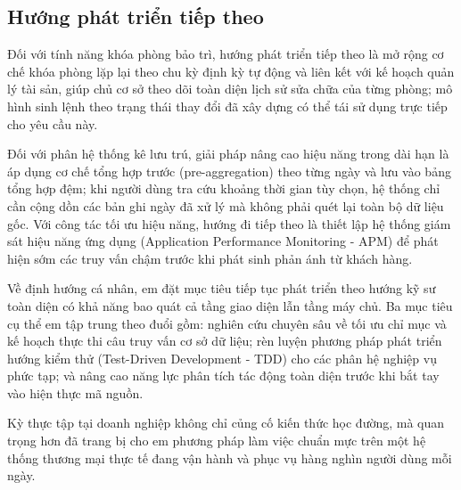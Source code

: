\subsection{Hướng phát triển tiếp theo}

Đối với tính năng khóa phòng bảo trì, hướng phát triển tiếp theo là mở rộng cơ chế khóa phòng lặp lại theo chu kỳ định kỳ tự động và liên kết với kế hoạch quản lý tài sản, giúp chủ cơ sở theo dõi toàn diện lịch sử sửa chữa của từng phòng; mô hình sinh lệnh theo trạng thái thay đổi đã xây dựng có thể tái sử dụng trực tiếp cho yêu cầu này.

Đối với phân hệ thống kê lưu trú, giải pháp nâng cao hiệu năng trong dài hạn là áp dụng cơ chế tổng hợp trước (pre-aggregation) theo từng ngày và lưu vào bảng tổng hợp đệm; khi người dùng tra cứu khoảng thời gian tùy chọn, hệ thống chỉ cần cộng dồn các bản ghi ngày đã xử lý mà không phải quét lại toàn bộ dữ liệu gốc. Với công tác tối ưu hiệu năng, hướng đi tiếp theo là thiết lập hệ thống giám sát hiệu năng ứng dụng (Application Performance Monitoring - APM) để phát hiện sớm các truy vấn chậm trước khi phát sinh phản ánh từ khách hàng.

Về định hướng cá nhân, em đặt mục tiêu tiếp tục phát triển theo hướng kỹ sư toàn diện có khả năng bao quát cả tầng giao diện lẫn tầng máy chủ. Ba mục tiêu cụ thể em tập trung theo đuổi gồm: nghiên cứu chuyên sâu về tối ưu chỉ mục và kế hoạch thực thi câu truy vấn cơ sở dữ liệu; rèn luyện phương pháp phát triển hướng kiểm thử (Test-Driven Development - TDD) cho các phân hệ nghiệp vụ phức tạp; và nâng cao năng lực phân tích tác động toàn diện trước khi bắt tay vào hiện thực mã nguồn.

Kỳ thực tập tại doanh nghiệp không chỉ củng cố kiến thức học đường, mà quan trọng hơn đã trang bị cho em phương pháp làm việc chuẩn mực trên một hệ thống thương mại thực tế đang vận hành và phục vụ hàng nghìn người dùng mỗi ngày.
